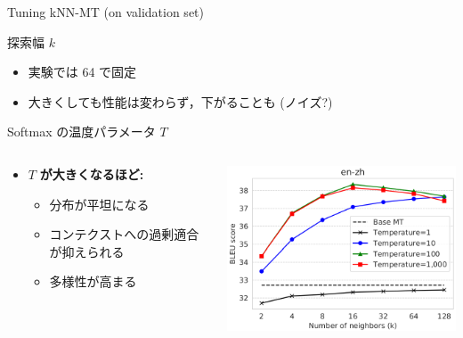 \documentclass[unicode, 12pt, xdvipdfmx, aspectratio=43]{beamer}
\begin{document}
\begin{frame}[label={sec:org87e85e3}]{Tuning kNN-MT (on validation set)}
\small
\begin{block}{探索幅 \(k\)}
\begin{itemize}
\item 実験では 64 で固定
\item 大きくしても性能は変わらず，下がることも (ノイズ?)
\end{itemize}
\end{block}

\begin{block}{Softmax の温度パラメータ \(T\)}
\begin{columns}
\begin{column}{0.6\columnwidth}
\begin{itemize}
\item \(T\) \textbf{が大きくなるほど:}
\begin{itemize}
\item 分布が平坦になる
\item コンテクストへの過剰適合が抑えられる
\item 多様性が高まる
\end{itemize}
\end{itemize}
\end{column}
\begin{column}{0.4\columnwidth}
\begin{center}
\includegraphics[width=\linewidth]{./figure/Figure2.pdf}
\end{center}
\end{column}
\end{columns}
\end{block}
\end{frame}
\end{document}
